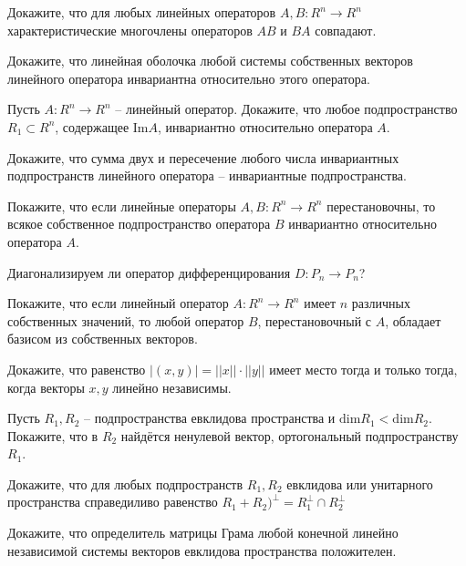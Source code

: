 \begin{list}{.}{}
\item Докажите, что для любых линейных операторов $A,B:R^n \to R^n$ характеристические многочлены операторов $AB$ и $BA$ совпадают.

\item Докажите, что линейная оболочка любой системы собственных векторов линейного оператора инвариантна относительно этого оператора.

\item Пусть $A:R^n \to R^n$ -- линейный оператор. Докажите, что любое подпространство $R_1 \subset R^n$, содержащее $\mathrm{Im}A$, инвариантно относительно оператора $A$.

\item Докажите, что сумма двух и пересечение любого числа инвариантных подпространств линейного оператора -- инвариантные подпространства.

\item Покажите, что если линейные операторы $A,B:R^n \to R^n$ перестановочны, то всякое собственное подпространство оператора $B$ инвариантно относительно оператора $A$.

\item Диагонализируем ли оператор дифференцирования $D:P_n \to P_n$?

\item Покажите, что если линейный оператор $A:R^n \to R^n$ имеет $n$ различных собственных значений, то любой оператор $B$, перестановочный с $A$, обладает базисом из собственных векторов.

\item Докажите, что равенство $|(x,y)|=||x||\cdot||y||$ имеет место тогда и только тогда, когда векторы $x,y$ линейно независимы.

\item Пусть $R_1, R_2$ -- подпространства евклидова пространства и $\mathrm{dim} R_1 < \mathrm{dim} R_2$. Покажите, что в $R_2$ найдётся ненулевой вектор, ортогональный подпространству $R_1$.

\item Докажите, что для любых подпространств  $R_1,R_2$ евклидова или унитарного пространства справедиливо равенство $R_1 + R_2)^\perp =R_1^\perp \cap R_2^\perp$

\item Докажите, что определитель матрицы Грама любой конечной линейно независимой системы векторов евклидова пространства положителен.

\end{list}


